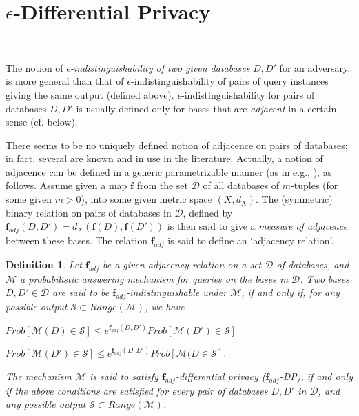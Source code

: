 \documentclass[pdflatex]{article}
\def \D {{\mathcal{D}}}
\def \M {{\mathcal{M}}}
\def \S {{\mathcal{S}}}
\newtheorem{defn}{Definition}
\def \lft {\noindent}
\newcommand{\brho}{\mathbf{f}}
\newcommand{\disp}[1]{\vspace*{-1em}
    \begin{center} {#1} \end{center} \vspace*{-1mm} }
\begin{document}
 
 \vspace*{-1em}
 \section{ {\large $\epsilon$-Differential Privacy} }~\label{DP}
  \vspace*{-2em}

  The  notion of  {\em $\epsilon$-indistinguishability  of two given databases} $D, D'$ 
  for an  adversary, is more general than that of   $\epsilon$-indistinguishability
  of pairs of query instances  giving the same output (defined above).
  $\epsilon$-indistinguishability for  pairs of databases $D, D'$ is usually  defined
  only for bases that are {\em adjacent} in a certain sense (cf. below).  

  There seems to be no uniquely defined  notion of adjacence on pairs of databases;
  in fact,   several  are  known and  in use in the literature. Actually, a notion of
  adjacence can  be   defined  in a generic  parametrizable  manner (as in
  e.g., \cite{dpMetrics2013}),  as follows.
  Assume given a map $\brho$ from the set $\D$ of all databases of 
  $m$-tuples  (for some given $m > 0$), into some given metric space $(X, d_X)$.
  The (symmetric) binary  relation  on pairs of databases in $\D$,  defined by 
  $\brho_{adj}(D, D') =  d_X(\brho(D), \brho(D'))$   is then said to give a {\em
    measure of adjacence}  between these  bases. The relation $\brho_{adj}$ is
  said  to define an `adjacency relation'. 
   
  \begin{defn} %
    Let  $\brho_{adj}$ be a given  adjacency  relation on a set $\D$ of databases, and 
    $\M$ a probabilistic answering mechanism for queries on the bases  in $\D$.
    Two bases $D, D' \in \D$ are said  to be   $\brho_{adj}$-indistinguishable
    under $\M$,  if and only if, for any   possible output  $\S \subset Range(\M)$,  we
    have
    
     \disp{$ Prob[\M(D) \in \S ]  \le e^{\brho_{adj}(D, D')} Prob[\M(D') \in \S]$ \par 
                    $ Prob[\M(D') \in \S ]  \le e^{\brho_{adj}(D, D')} Prob[\M(D \in \S]$.}
     
     \lft The mechanism $\M$ is said to  satisfy     {\em $\brho_{adj}$-differential privacy}
     ($\brho_{adj}$-DP),  if and  only if the above conditions are   satisfied for  {\em every
     pair of  databases}   $D, D'$ in $\D$, and  any possible output  $\S \subset  Range(\M)$. 
    \end{defn}
      
\end{document}
